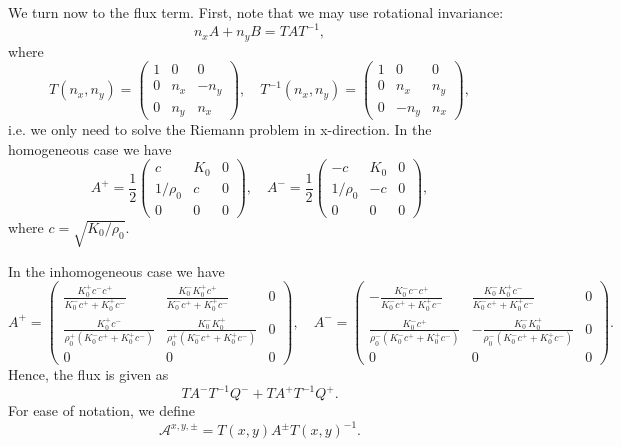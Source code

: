\documentclass[a4paper]{scrartcl}
\begin{document}
We turn now to the flux term. First, note that we may use rotational invariance:
\begin{equation}
 n_xA + n_yB = TAT^{-1},
\end{equation}
where
\begin{equation}
T(n_x,n_y)=\begin{pmatrix}
 1 & 0 & 0 \\
 0 & n_x & -n_y \\
 0 & n_y & n_x
\end{pmatrix}, \quad
T^{-1}(n_x,n_y)=\begin{pmatrix}
 1 & 0 & 0 \\
 0 & n_x & n_y \\
 0 & -n_y & n_x
\end{pmatrix},
\end{equation}
i.e. we only need to solve the Riemann problem in x-direction. In the homogeneous case we have
\begin{equation}
 A^{+} = \frac{1}{2}\begin{pmatrix}
 c & K_0 & 0 \\
 1/\rho_0 & c & 0 \\
 0 & 0 & 0
\end{pmatrix}, \quad
 A^{-} = \frac{1}{2}\begin{pmatrix}
 -c & K_0 & 0 \\
 1/\rho_0 & -c & 0 \\
 0 & 0 & 0
\end{pmatrix},
\end{equation}
where $c=\sqrt{K_0/\rho_0}$.

In the inhomogeneous case we have
\begin{equation}
 A^{+} = \begin{pmatrix}
 \frac{K_0^+c^-c^+}{K_0^-c^++K_0^+c^-} & \frac{K_0^-K_0^+c^+}{K_0^-c^++K_0^+c^-} & 0 \\
 \frac{K_0^+c^-}{\rho_0^+\left(K_0^-c^++K_0^+c^-\right)} & \frac{K_0^-K_0^+}{\rho_0^+\left(K_0^-c^++K_0^+c^-\right)} & 0 \\
 0 & 0 & 0
\end{pmatrix}, \quad
 A^{-} = \begin{pmatrix}
 -\frac{K_0^-c^-c^+}{K_0^-c^++K_0^+c^-} & \frac{K_0^-K_0^+c^-}{K_0^-c^++K_0^+c^-} & 0 \\
 \frac{K_0^-c^+}{\rho_0^-\left(K_0^-c^++K_0^+c^-\right)} & -\frac{K_0^-K_0^+}{\rho_0^-\left(K_0^-c^++K_0^+c^-\right)} & 0 \\
 0 & 0 & 0
\end{pmatrix}.
\end{equation}
Hence, the flux is given as
\begin{equation}
 TA^-T^{-1}Q^- + TA^+T^{-1}Q^+.
\end{equation}
For ease of notation, we define
\begin{equation}
 \mathcal{A}^{x,y,\pm} = T(x,y)A^\pm T(x,y)^{-1}.
\end{equation}
\end{document}

